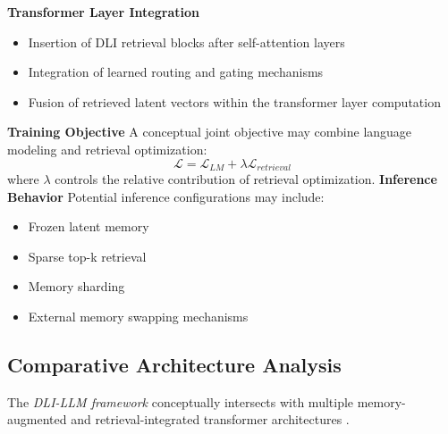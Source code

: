 \textbf{Transformer Layer Integration}

\begin{itemize}
\item  Insertion of DLI retrieval blocks after self-attention layers
\item  Integration of learned routing and gating mechanisms
\item  Fusion of retrieved latent vectors within the transformer layer computation
\end{itemize}

\textbf{Training Objective}
A conceptual joint objective may combine language modeling and retrieval optimization:
\[\mathcal{L =}\mathcal{L}_{LM} + \lambda\mathcal{L}_{retrieval}\]
where \(\lambda\) controls the relative contribution of retrieval optimization.
\textbf{Inference Behavior}
Potential inference configurations may include:

\begin{itemize}
\item  Frozen latent memory
\item  Sparse top-k retrieval
\item  Memory sharding
\item  External memory swapping mechanisms
\end{itemize}

\hypertarget{comparative-architecture-analysis}{%
\subsection{Comparative Architecture Analysis}}
\label{comparative-architecture-analysis}

The \emph{DLI-LLM framework} conceptually intersects with multiple memory-augmented and retrieval-integrated transformer architectures \cite{Wu2022}.

